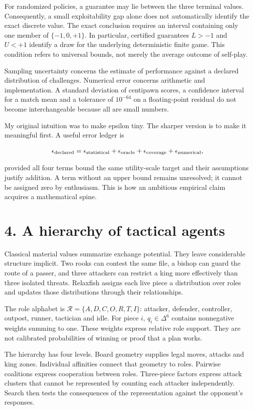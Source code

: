 \documentclass[10pt]{article}
\begin{document}
For randomized policies, a guarantee may lie between the three terminal values. Consequently, a small exploitability gap alone does not automatically identify the exact discrete value. The exact conclusion requires an interval containing only one member of $\{-1,0,+1\}$. In particular, certified guarantees $L> -1$ and $U<+1$ identify a draw for the underlying deterministic finite game. This condition refers to universal bounds, not merely the average outcome of self-play.

Sampling uncertainty concerns the estimate of performance against a declared distribution of challenges. Numerical error concerns arithmetic and implementation. A standard deviation of centipawn scores, a confidence interval for a match mean and a tolerance of $10^{-64}$ on a floating-point residual do not become interchangeable because all are small numbers.

My original intuition was to make epsilon tiny. The sharper version is to make it meaningful first. A useful error ledger is

\[
\epsilon_{\rm declared}=\epsilon_{\rm statistical}+
\epsilon_{\rm oracle}+\epsilon_{\rm coverage}+\epsilon_{\rm numerical},
\]

provided all four terms bound the same utility-scale target and their assumptions justify addition. A term without an upper bound remains unresolved; it cannot be assigned zero by enthusiasm. This is how an ambitious empirical claim acquires a mathematical spine.

\clearpage
\section*{4. A hierarchy of tactical agents}
Classical material values summarize exchange potential. They leave considerable structure implicit. Two rooks can contest the same file, a bishop can guard the route of a passer, and three attackers can restrict a king more effectively than three isolated threats. Relaxfish assigns each live piece a distribution over roles and updates those distributions through their relationships.

The role alphabet is $\mathcal R=\{A,D,C,O,R,T,I\}$: attacker, defender, controller, outpost, runner, tactician and idle. For piece $i$, $q_i\in\Delta^6$ contains nonnegative weights summing to one. These weights express relative role support. They are not calibrated probabilities of winning or proof that a plan works.

The hierarchy has four levels. Board geometry supplies legal moves, attacks and king zones. Individual affinities connect that geometry to roles. Pairwise coalitions express cooperation between roles. Three-piece factors express attack clusters that cannot be represented by counting each attacker independently. Search then tests the consequences of the representation against the opponent's responses.
\end{document}
